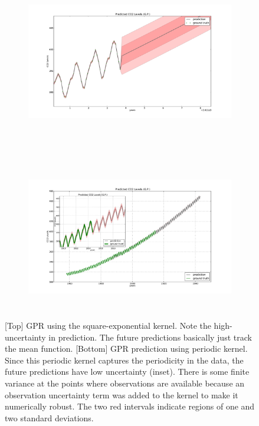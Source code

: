 \documentclass[11pt]{report}
\begin{document}
\begin{figure}[htp]
\begin{center}
\begin{subfigure}[h]{\linewidth}
\includegraphics[width=18cm,height=6.5cm]{figs/co2_predict_gp.pdf}
\end{subfigure}\\
\begin{subfigure}[h]{\linewidth}
\includegraphics[width=18cm,height=6.5cm]{figs/co2_predict_gp_comb.pdf}
\end{subfigure}
\end{center}
\caption[]{[Top] GPR using the square-exponential kernel. Note the high-uncertainty in prediction. The future predictions basically just track the mean function. [Bottom] GPR prediction using periodic kernel. Since this periodic kernel captures the periodicity in the data, the future predictions have low uncertainty (inset). There is some finite variance at the points where observations are available because an observation uncertainty term was added to the kernel to make it numerically robust. The two red intervals indicate regions of one and two standard deviations.}
\label{fig:gpr}
\end{figure}
\clearpage
\end{document}
